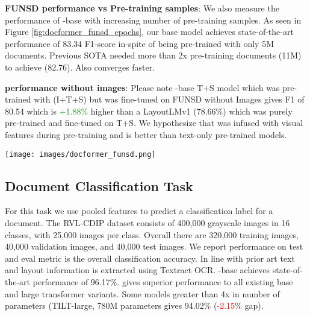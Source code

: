 \textbf{FUNSD performance vs Pre-training samples}: We also measure the performance of \papertitle-base with increasing number of pre-training samples. As seen in Figure \ref{fig:docformer_funsd_epochs}, our base model achieves state-of-the-art performance of 83.34 F1-score in-spite of being pre-trained with only 5M documents. Previous SOTA needed more than 2x pre-training documents (11M) to achieve (82.76). Also \papertitle converges faster. 

\textbf{\papertitle performance without images}: Please note \papertitle-base T+S model which was pre-trained with (I+T+S) but was fine-tuned on FUNSD without Images gives F1 of 80.54 which is \textcolor{forestgreen}{+1.88\%} higher than a LayoutLMv1 (78.66\%) which was purely pre-trained and fine-tuned on T+S. We hypothesize that \papertitle was infused with visual features during pre-training and is better than text-only pre-trained models. 

\begin{SCfigure}[10]
  \centering
  \texttt{[image: images/docformer\_funsd.png]}
  \caption{\textbf{Amount of Pre-training matters}: -axis is the number of pre-training samples needed. -axis is the F1-score on FUNSD task. \papertitle-base gets 83.34 after pre-training on only 5M pages and outperforms current SOTA LayoutLMv2-base's 82.76 which was pretrained on more than 2x more data.}
  \label{fig:docformer_funsd_epochs}
  \vspace{-3ex}
\end{SCfigure}





\subsection{Document Classification Task}
For this task we use pooled features to predict a classification label for a document. The RVL-CDIP \cite{harley2015icdar} dataset consists of 400,000 grayscale images in 16 classes, with 25,000 images per class. Overall there are 320,000 training images, 40,000 validation images, and 40,000 test images. We report performance on test and eval metric is the overall classification accuracy. In line with prior art \cite{xu2020layoutlmv2,bros2020hong} text and layout information is extracted using Textract OCR. \papertitle-base achieves state-of-the-art performance of 96.17\%. \papertitle gives superior performance to all existing base and large transformer variants. Some models greater than 4x in number of parameters (TILT-large, 780M parameters gives 94.02\% (\textcolor{red}{-2.15}\% gap). 

